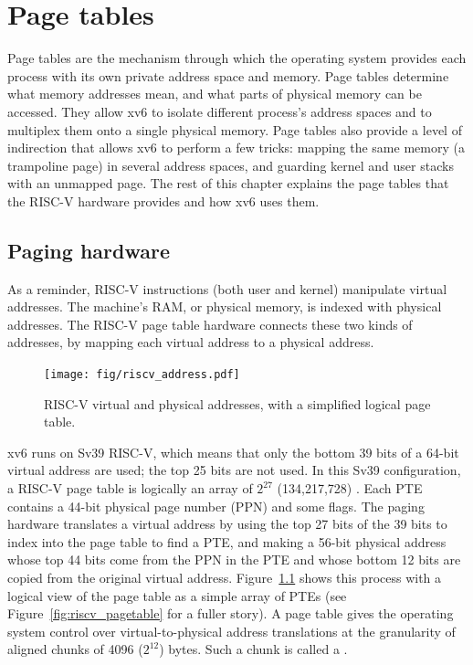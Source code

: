 \chapter{Page tables}
\label{CH:MEM}

Page tables are the mechanism through which the operating system
provides each process with its own private address space and memory.
Page tables determine what memory addresses mean, and what parts of
physical memory can be accessed. They allow xv6 to isolate different
process's address spaces and to multiplex them onto a single physical
memory. Page tables also provide a level of indirection that allows xv6 to
perform a few tricks: mapping the same memory (a trampoline page) in
several address spaces, and guarding kernel and user stacks with an
unmapped page. The rest of this chapter explains the page tables that
the RISC-V hardware provides and how xv6 uses them.

\section{Paging hardware}
As a reminder,
RISC-V instructions (both user and kernel) manipulate virtual addresses.
The machine's RAM, or physical memory, is indexed with physical
addresses.
The RISC-V page table hardware connects these two kinds of addresses,
by mapping each virtual address to a physical address.

\begin{figure}[t]
\center
\texttt{[image: fig/riscv\_address.pdf]}
\caption{RISC-V virtual and physical addresses, with a simplified
logical page table.}
\label{fig:riscv_address}
\end{figure}

xv6 runs on Sv39 RISC-V, which means that only the bottom 39
bits of a 64-bit virtual address are used; the top 25 bits
are not used.
In this Sv39 configuration, a
RISC-V page table is logically an array of $2^{27}$ (134,217,728)
.  Each PTE contains a 44-bit
physical page number (PPN) and some flags. The paging hardware
translates a virtual address by using the top 27 bits of the 39 bits
to index into the page table to find a PTE, and making a 56-bit
physical address whose top 44 bits come from the PPN in the PTE
and whose bottom 12 bits are copied from the original virtual address.
Figure~\ref{fig:riscv_address} shows this
process with a logical view of the page table as a simple array of PTEs
(see Figure~\ref{fig:riscv_pagetable} for a fuller story).
A page table
gives the operating system control over virtual-to-physical address
translations at the granularity of aligned chunks of 4096 ($2^{12}$)
bytes.  Such a chunk is called a .

